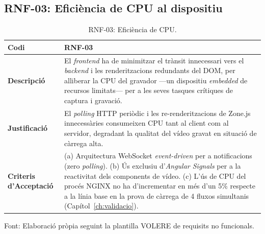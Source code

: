 \subsection{RNF-03: Eficiència de CPU al dispositiu}
\begin{table}[htbp]
  \centering
  \small
  \begin{tabular}{|l|p{10cm}|}
    \hline
    \textbf{Codi}                    & RNF-03 \\ \hline
    \textbf{Descripció}              & El \textit{frontend} ha de minimitzar el trànsit innecessari vers el \textit{backend} i les renderitzacions redundants del DOM, per alliberar la CPU del gravador ---un dispositiu \textit{embedded} de recursos limitats--- per a les seves tasques crítiques de captura i gravació. \\ \hline
    \textbf{Justificació}            & El \textit{polling} HTTP periòdic i les re-renderitzacions de Zone.js innecessàries consumeixen CPU tant al client com al servidor, degradant la qualitat del vídeo gravat en situació de càrrega alta. \\ \hline
    \textbf{Criteris d'Acceptació}   & (a) Arquitectura WebSocket \textit{event-driven} per a notificacions (zero \textit{polling}). (b) Ús exclusiu d'\textit{Angular Signals} per a la reactivitat dels components de vídeo. (c) L'ús de CPU del procés NGINX no ha d'incrementar en més d'un 5\% respecte a la línia base en la prova de càrrega de 4 fluxos simultanis (Capítol~\ref{ch:validacio}). \\ \hline
  \end{tabular}
  \caption{RNF-03: Eficiència de CPU.}
  \label{tab:rnf03}
\par\smallskip
\small Font: Elaboració pròpia seguint la plantilla VOLERE de requisits no funcionals.
\end{table}

